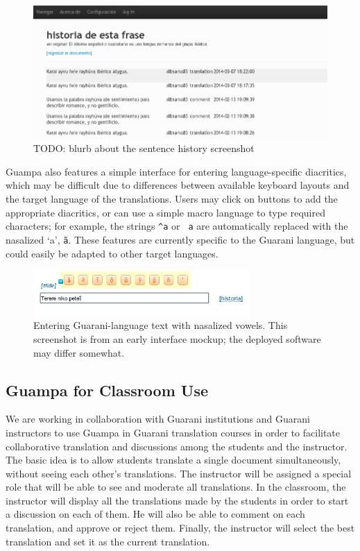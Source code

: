 \documentclass[10pt, a4paper]{article}
\begin{document}
\begin{figure}
  \begin{center}
\includegraphics[width=12cm]{sentence-history}
  \end{center}
\caption{TODO: blurb about the sentence history screenshot}
\end{figure}

Guampa also features a simple interface for entering language-specific
diacritics, which may be difficult due to differences between available
keyboard layouts and the target language of the translations. Users may click
on buttons to add the appropriate diacritics, or can use a simple macro
language to type required characters; for example, the strings
\texttt{\string^a} or 
\texttt{\string~a} are automatically replaced with the nasalized `a',
\texttt{\~a}.
These features are currently specific to the Guarani language, but could easily
be adapted to other target languages.

\begin{figure}
\includegraphics[width=8.25cm]{guampa-tildes}
\caption{Entering Guarani-language text with nasalized vowels. This screenshot
is from an early interface mockup; the deployed software may differ
somewhat.}
\end{figure}

\subsection{Guampa for Classroom Use}
We are working in collaboration with Guarani institutions and Guarani
instructors to use Guampa in Guarani translation courses in order to facilitate
collaborative translation and discussions among the students and the
instructor. The basic idea is to allow students translate a single document
simultaneously, without seeing each other's translations. The instructor will
be assigned a special role that will be able to see and moderate all
translations. In the classroom, the instructor will display all the
translations made by the students in order to start a discussion on each of
them. He will also be able to comment on each translation, and approve or
reject them. Finally, the instructor will select the best translation and set
it as the current translation.
\end{document}
